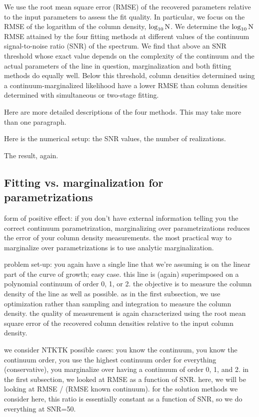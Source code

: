 \documentclass[manuscript]{aastex62}
\begin{document}
We use the root mean square error (RMSE) of the recovered parameters relative to the input parameters to assess the fit quality.
In particular, we focus on the RMSE of the logarithm of the column density, $\log_{10}{\rm N}$.
We determine the $\log_{10}{\rm N}$ RMSE attained by the four fitting methods at different values of the continuum signal-to-noise ratio (SNR) of the spectrum.
We find that above an SNR threshold whose exact value depends on the complexity of the continuum and the actual parameters of the line in question, marginalization and both fitting methods do equally well.
Below this threshold, column densities determined using a continuum-marginalized likelihood have a lower RMSE than column densities determined with simultaneous or two-stage fitting.

Here are more detailed descriptions of the four methods. This may take more than one paragraph.

Here is the numerical setup: the SNR values, the number of realizations.

The result, again.

\subsection{Fitting vs. marginalization for parametrizations}
form of positive effect: if you don't have external information telling you the correct continuum parametrization, marginalizing over parametrizations reduces the error of your column density measurements.
the most practical way to marginalize over parametrizations is to use analytic marginalization.

problem set-up: you again have a single line that we're assuming is on the linear part of the curve of growth; easy case.
this line is (again) superimposed on a polynomial continuum of order 0, 1, or 2.
the objective is to measure the column density of the line as well as possible.
as in the first subsection, we use optimization rather than sampling and integration to measure the column density.
the quality of measurement is again characterized using the root mean square error of the recovered column densities relative to the input column density.

we consider NTKTK possible cases: you know the continuum, you know the continuum order, you use the highest continuum order for everything (conservative), you marginalize over having a continuum of order 0, 1, and 2.
in the first subsection, we looked at RMSE as a function of SNR.
here, we will be looking at RMSE / (RMSE known continuum).
for the solution methods we consider here, this ratio is essentially constant as a function of SNR, so we do everything at SNR=50.
\end{document}

